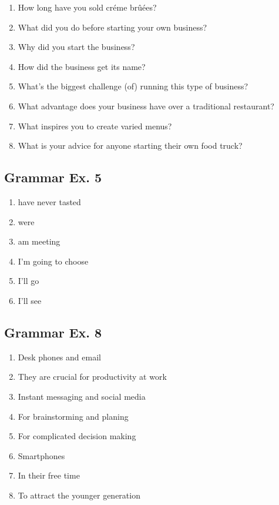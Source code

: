 \documentclass[12pt, a4paper, oneside]{article}
\begin{document}
  \begin{enumerate}[1.]
    \item How long have you sold créme brûées?
    \item What did you do before starting your own business?
    \item Why did you start the business?
    \item How did the business get its name?
    \item What's the biggest challenge (of) running this type of business?
    \item What advantage does your business have over a traditional restaurant?
    \item What inspires you to create varied menus?
    \item What is your advice for anyone starting their own food truck?
  \end{enumerate} 

  \subsection{Grammar Ex. 5}
  \begin{enumerate}[1.]
    \item have never tasted
    \item were
    \item am meeting
    \item I'm going to choose
    \item I'll go
    \item I'll see
  \end{enumerate}

  \subsection{Grammar Ex. 8}
  \begin{enumerate}[1.]
    \item Desk phones and email
    \item They are crucial for productivity at work
    \item Instant messaging and social media
    \item For brainstorming and planing
    \item For complicated decision making
    \item Smartphones
    \item In their free time
    \item To attract the younger generation
  \end{enumerate}
\end{document}
